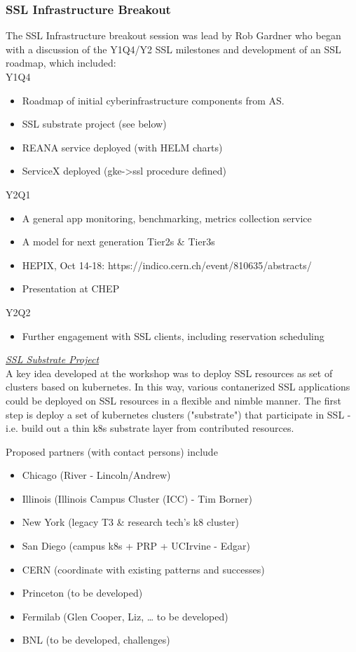 \documentclass[11pt,letterpaper,fleqn]{article}
\begin{document}
\subsubsection{SSL Infrastructure Breakout}
\vspace{0.2cm}
The SSL Infrastructure breakout session was lead by Rob Gardner who began with a discussion of the Y1Q4/Y2 SSL milestones and development of an SSL roadmap, which included: \\
Y1Q4
\begin{itemize}
  \item Roadmap of initial cyberinfrastructure components from AS.
  \item SSL substrate project (see below)
  \item REANA service deployed (with HELM charts)
  \item ServiceX deployed (gke->ssl procedure defined)
\end{itemize}
Y2Q1
\begin{itemize}
  \item A general app monitoring, benchmarking, metrics collection service
  \item A model for next generation Tier2s \& Tier3s
  \item HEPIX, Oct 14-18: https://indico.cern.ch/event/810635/abstracts/
  \item Presentation at CHEP
\end{itemize}
Y2Q2
\begin{itemize}
  \item Further engagement with SSL clients, including reservation scheduling
\end{itemize}

\vspace{0.1cm}\noindent
\textit{\underline{SSL Substrate Project}} \\
A key idea developed at the workshop was to deploy SSL resources as set of clusters based on kubernetes. In this way, various contanerized SSL applications could be deployed on SSL resources in a flexible and nimble manner. The first step is deploy a set of kubernetes clusters ("substrate") that participate in SSL - i.e. build out a thin k8s substrate layer from contributed resources.

Proposed partners (with contact persons) include
\begin{itemize}
  \item Chicago (River - Lincoln/Andrew)
  \item Illinois (Illinois Campus Cluster (ICC) - Tim Borner)
  \item New York (legacy T3 \& research tech’s k8 cluster)
  \item San Diego (campus k8s + PRP + UCIrvine - Edgar)
  \item CERN (coordinate with existing patterns and successes)
  \item Princeton (to be developed)
  \item Fermilab (Glen Cooper, Liz, … to be developed)
  \item BNL (to be developed, challenges)
\end{itemize}
\end{document}
